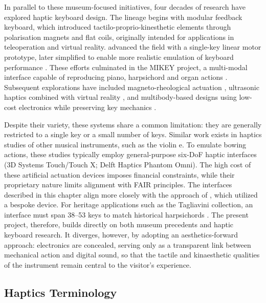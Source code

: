 In parallel to these museum-focused initiatives, four decades of research 
have explored haptic keyboard design. The lineage begins with \citep{cadoz_modular_1990} modular feedback keyboard, which introduced tactilo-proprio-kinesthetic elements through polarisation magnets and flat coils, originally intended for applications in teleoperation and virtual reality. \textcite{gillespie_dynamical_1992} advanced the field with a single-key linear motor prototype, later simplified to enable more realistic emulation of keyboard performance \cite{gillespie_virtual_1994}. These efforts culminated in the MIKEY project, a multi-modal interface capable of reproducing piano, harpsichord and organ actions \cite{oboe_mikey_2006}. Subsequent explorations have included magneto-rheological actuation \cite{lozada_novel_2007}, ultrasonic haptics combined with virtual reality \cite{hwang_airpiano_2017}, and multibody-based designs using low-cost electronics while preserving key mechanics \cite{timmermans_multibody-based_2020}.

Despite their variety, these systems share a common limitation: they are generally restricted to a single key or a small number of keys.
Similar work exists in haptics studies of other musical instruments, such as the violin e\cite{nichols_vbow_2002, giordano_force_2012, willemsen_resurrecting_2020, onofrei_bowing_2022}. To emulate bowing actions, these studies typically employ general-purpose six-DoF haptic interfaces (3D Systems Touch/Touch X; Delft Haptics Phantom Omni).
The high cost of these artificial actuation devices imposes financial constraints, while their proprietary nature limits alignment with FAIR principles.
The interfaces described in this chapter align more closely with the approach of \textcite{nichols_vbow_2002}, which utilized a bespoke device.
For heritage applications such as the Tagliavini 
collection, an interface must span 38--53 keys to match historical harpsichords \cite{tagliavini_clavicembali_1987}. 
The present project, therefore, builds directly on both museum precedents and haptic keyboard research. 
It diverges, however, by adopting an aesthetics-forward approach: electronics are concealed, serving only as a transparent link between mechanical action and digital sound, so that the tactile and kinaesthetic qualities of the instrument remain central to the visitor’s experience.  
 
\subsection{Haptics Terminology}

